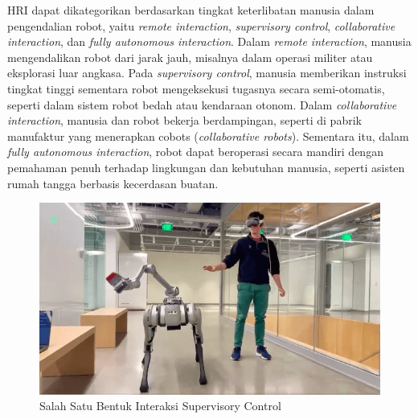 HRI dapat dikategorikan berdasarkan tingkat keterlibatan manusia dalam pengendalian robot, yaitu \emph{remote interaction},
\emph{supervisory control}, \emph{collaborative interaction}, dan \emph{fully autonomous interaction}. Dalam \emph{remote interaction}, manusia
mengendalikan robot dari jarak jauh, misalnya dalam operasi militer atau eksplorasi luar angkasa. Pada \emph{supervisory control},
manusia memberikan instruksi tingkat tinggi sementara robot mengeksekusi tugasnya secara semi-otomatis, seperti dalam sistem
robot bedah atau kendaraan otonom. Dalam \emph{collaborative interaction}, manusia dan robot bekerja berdampingan, seperti di pabrik
manufaktur yang menerapkan cobots (\emph{collaborative robots}). Sementara itu, dalam \emph{fully autonomous interaction}, robot dapat
beroperasi secara mandiri dengan pemahaman penuh terhadap lingkungan dan kebutuhan manusia, seperti asisten rumah tangga
berbasis kecerdasan buatan.

\begin{figure} [H] \centering
    \includegraphics[scale=0.4]{gambar/HRI daster.png}
    \caption{Salah Satu Bentuk Interaksi Supervisory Control\parencite{img_HRI}}
    \label{fig:HRI_daster}
\end{figure}

